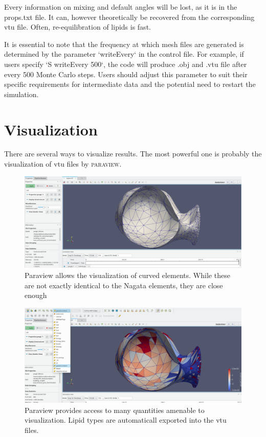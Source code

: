 \documentclass[11pt]{article}
\begin{document}
Every information on mixing and default angles will be lost, as it is in the props.txt file. It can, however theoretically be recovered from the corresponding vtu file. Often, re-equilibration of lipids is fast.

\noindent
It is essential to note that the frequency at which mesh files are generated is determined by the parameter `writeEvery` in the control file. For example, if users specify `S writeEvery 500`, the code will produce .obj and .vtu file after every 500 Monte Carlo steps. Users should adjust this parameter to suit their specific requirements for intermediate data and the potential need to restart the simulation.


\section{Visualization}

There are several ways to visualize results. The most powerful one is probably the visualization of vtu files by \textsc{paraview}. 
\begin{figure}[H]
    \centering
    \includegraphics[width=\linewidth]{subdivision.png}
    \caption{Paraview allows the visualization of curved elements. While these are not exactly identical to the Nagata elements, they are close enough}
    \label{fig:curved}
\end{figure}

\begin{figure}[h]
    \centering
    \includegraphics[width=\linewidth]{choice.png}
    \caption{Paraview provides access to many quantities amenable to visualization. Lipid types are automaticall exported into the vtu files.}
    \label{fig:choice}
\end{figure}
\end{document}
